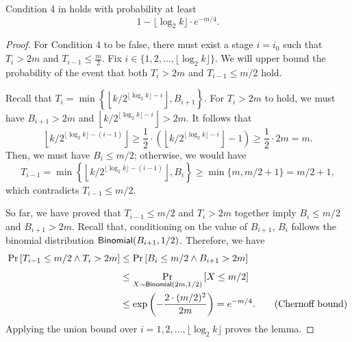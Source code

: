 \begin{lemma}\label{lemma:exact-cond-4}
    Condition 4 in  holds with probability at least \[
    1 - \lfloor \log_2 k\rfloor \cdot e^{-m/4}.
    \]
\end{lemma}
\begin{proof}
    For Condition 4 to be false, there must exist a stage $i = i_0 $ such that $T_i > 2m$ and $T_{i-1}\le \frac{m}{2}$. Fix $i \in \{1, 2, \ldots, \lfloor \log_2k \rfloor\}$. We will upper bound the probability of the event that both $T_i > 2m$ and $T_{i-1} \le m/2$ hold.
    
    Recall that $T_i = \min\left\{\left\lfloor k/2^{\lfloor\log_2 k\rfloor -i}\right\rfloor, B_{i+1}\right\}$. For $T_i > 2m$ to hold, we must have $B_{i+1} > 2m$ and $\left\lfloor k/2^{\lfloor\log_2 k\rfloor -i}\right\rfloor > 2m$. It follows that
    \[
        \left\lfloor k/2^{\lfloor\log_2 k\rfloor -(i-1)}\right\rfloor \ge \frac{1}{2}\cdot \left(\left\lfloor k/2^{\lfloor\log_2 k\rfloor -i}\right\rfloor - 1\right) \ge \frac{1}{2}\cdot 2m = m.
    \]
    Then, we must have $B_i \le m / 2$; otherwise, we would have
    \[
        T_{i-1}
    =   \min\left\{\left\lfloor k/2^{\lfloor\log_2 k\rfloor -(i-1)}\right\rfloor, B_i\right\}
    \ge \min\{m, m/2 + 1\}
    =   m/2+1,
    \]
    which contradicts $T_{i-1} \le m/2$.
    

    So far, we have proved that $T_{i-1} \le m / 2$ and $T_i > 2m$ together imply $B_i \le m/2$ and $B_{i+1} > 2m$. Recall that, conditioning on the value of $B_{i+1}$, $B_i$ follows the binomial distribution $\mathsf{Binomial}(B_{i+1}, 1/2)$. Therefore, we have
    \begin{align*}
        \Pr_{}\left[T_{i-1} \le m/2 \wedge T_i > 2m\right]
    &\le\Pr_{}\left[B_i \le m/2 \wedge B_{i + 1} > 2m\right]\\
    &\le\Pr_{X \sim \mathsf{Binomial}(2m, 1/2)}\left[X \le m/2\right] \\
    &\le\exp\left(-\frac{2\cdot (m/2)^2}{2m}\right) 
    =   e^{-m/4}. \tag{Chernoff bound}
    \end{align*}
    Applying the union bound over $i = 1, 2, \ldots, \lfloor \log_2 k\rfloor$ proves the lemma.
\end{proof}

